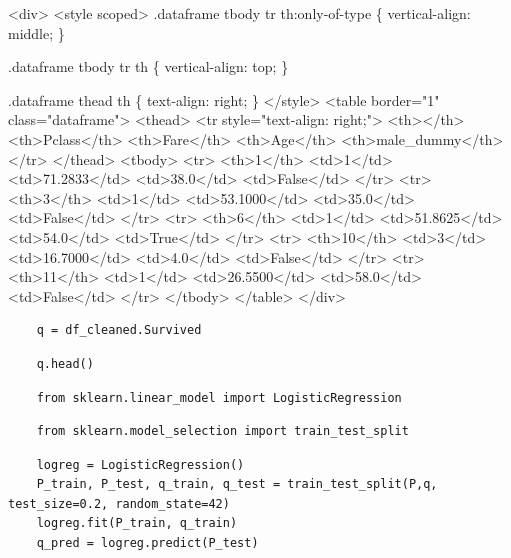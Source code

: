 \documentclass[11pt]{article}
\begin{document}
\begin{HTML}
<div>
<style scoped>
    .dataframe tbody tr th:only-of-type \{
	vertical-align: middle;
    \}

.dataframe tbody tr th \{
    vertical-align: top;
\}

    .dataframe thead th \{
	text-align: right;
    \}
</style>
<table border="1" class="dataframe">
  <thead>
    <tr style="text-align: right;">
      <th></th>
      <th>Pclass</th>
      <th>Fare</th>
      <th>Age</th>
      <th>male\_dummy</th>
    </tr>
  </thead>
  <tbody>
    <tr>
      <th>1</th>
      <td>1</td>
      <td>71.2833</td>
      <td>38.0</td>
      <td>False</td>
    </tr>
    <tr>
      <th>3</th>
      <td>1</td>
      <td>53.1000</td>
      <td>35.0</td>
      <td>False</td>
    </tr>
    <tr>
      <th>6</th>
      <td>1</td>
      <td>51.8625</td>
      <td>54.0</td>
      <td>True</td>
    </tr>
    <tr>
      <th>10</th>
      <td>3</td>
      <td>16.7000</td>
      <td>4.0</td>
      <td>False</td>
    </tr>
    <tr>
      <th>11</th>
      <td>1</td>
      <td>26.5500</td>
      <td>58.0</td>
      <td>False</td>
    </tr>
  </tbody>
</table>
</div>
\end{HTML}

\begin{verbatim}
    q = df_cleaned.Survived
\end{verbatim}

\begin{verbatim}
    q.head()
\end{verbatim}

\begin{verbatim}
    from sklearn.linear_model import LogisticRegression
\end{verbatim}

\begin{verbatim}
    from sklearn.model_selection import train_test_split
\end{verbatim}

\begin{verbatim}
    logreg = LogisticRegression()
    P_train, P_test, q_train, q_test = train_test_split(P,q, test_size=0.2, random_state=42)
    logreg.fit(P_train, q_train)
    q_pred = logreg.predict(P_test)
\end{verbatim}
\end{document}
